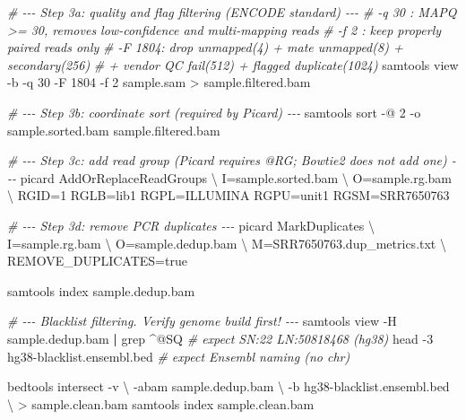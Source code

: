 \documentclass[
  11pt,
  a4paper,
]{article}
\newenvironment{Shaded}{}{}
\newcommand{\AttributeTok}[1]{\textcolor[rgb]{0.49,0.56,0.16}{#1}}
\newcommand{\CommentTok}[1]{\textcolor[rgb]{0.38,0.63,0.69}{\textit{#1}}}
\newcommand{\DataTypeTok}[1]{\textcolor[rgb]{0.56,0.13,0.00}{#1}}
\newcommand{\ExtensionTok}[1]{#1}
\newcommand{\FunctionTok}[1]{\textcolor[rgb]{0.02,0.16,0.49}{#1}}
\newcommand{\KeywordTok}[1]{\textcolor[rgb]{0.00,0.44,0.13}{\textbf{#1}}}
\newcommand{\NormalTok}[1]{#1}
\newcommand{\OperatorTok}[1]{\textcolor[rgb]{0.40,0.40,0.40}{#1}}
\newcommand{\StringTok}[1]{\textcolor[rgb]{0.25,0.44,0.63}{#1}}
\begin{document}
\begin{Shaded}
\begin{Highlighting}[]
\CommentTok{\# {-}{-}{-} Step 3a: quality and flag filtering (ENCODE standard) {-}{-}{-}}
\CommentTok{\# {-}q 30  : MAPQ \textgreater{}= 30, removes low{-}confidence and multi{-}mapping reads}
\CommentTok{\# {-}f 2   : keep properly paired reads only}
\CommentTok{\# {-}F 1804: drop unmapped(4) + mate unmapped(8) + secondary(256)}
\CommentTok{\#          + vendor QC fail(512) + flagged duplicate(1024)}
\ExtensionTok{samtools}\NormalTok{ view }\AttributeTok{{-}b} \AttributeTok{{-}q}\NormalTok{ 30 }\AttributeTok{{-}F}\NormalTok{ 1804 }\AttributeTok{{-}f}\NormalTok{ 2 sample.sam }\OperatorTok{\textgreater{}}\NormalTok{ sample.filtered.bam}

\CommentTok{\# {-}{-}{-} Step 3b: coordinate sort (required by Picard) {-}{-}{-}}
\ExtensionTok{samtools}\NormalTok{ sort }\AttributeTok{{-}@}\NormalTok{ 2 }\AttributeTok{{-}o}\NormalTok{ sample.sorted.bam sample.filtered.bam}

\CommentTok{\# {-}{-}{-} Step 3c: add read group (Picard requires @RG; Bowtie2 does not add one) {-}{-}{-}}
\ExtensionTok{picard}\NormalTok{ AddOrReplaceReadGroups }\DataTypeTok{\textbackslash{}}
\NormalTok{  I=sample.sorted.bam }\DataTypeTok{\textbackslash{}}
\NormalTok{  O=sample.rg.bam }\DataTypeTok{\textbackslash{}}
\NormalTok{  RGID=1 RGLB=lib1 RGPL=ILLUMINA RGPU=unit1 RGSM=SRR7650763}

\CommentTok{\# {-}{-}{-} Step 3d: remove PCR duplicates {-}{-}{-}}
\ExtensionTok{picard}\NormalTok{ MarkDuplicates }\DataTypeTok{\textbackslash{}}
\NormalTok{  I=sample.rg.bam }\DataTypeTok{\textbackslash{}}
\NormalTok{  O=sample.dedup.bam }\DataTypeTok{\textbackslash{}}
\NormalTok{  M=SRR7650763.dup\_metrics.txt }\DataTypeTok{\textbackslash{}}
\NormalTok{  REMOVE\_DUPLICATES=true}

\ExtensionTok{samtools}\NormalTok{ index sample.dedup.bam}

\CommentTok{\# {-}{-}{-} Blacklist filtering. Verify genome build first! {-}{-}{-}}
\ExtensionTok{samtools}\NormalTok{ view }\AttributeTok{{-}H}\NormalTok{ sample.dedup.bam }\KeywordTok{|} \FunctionTok{grep} \StringTok{\textquotesingle{}\textasciicircum{}@SQ\textquotesingle{}}   \CommentTok{\# expect SN:22 LN:50818468 (hg38)}
\FunctionTok{head} \AttributeTok{{-}3}\NormalTok{ hg38{-}blacklist.ensembl.bed                }\CommentTok{\# expect Ensembl naming (no \textquotesingle{}chr\textquotesingle{})}

\ExtensionTok{bedtools}\NormalTok{ intersect }\AttributeTok{{-}v} \DataTypeTok{\textbackslash{}}
  \AttributeTok{{-}abam}\NormalTok{ sample.dedup.bam }\DataTypeTok{\textbackslash{}}
  \AttributeTok{{-}b}\NormalTok{ hg38{-}blacklist.ensembl.bed }\DataTypeTok{\textbackslash{}}
  \OperatorTok{\textgreater{}}\NormalTok{ sample.clean.bam}
\ExtensionTok{samtools}\NormalTok{ index sample.clean.bam}


\end{Highlighting}
\end{Shaded}
\end{document}
